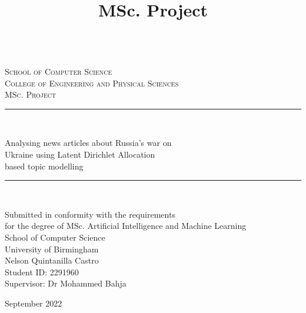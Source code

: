 \documentclass[twoside,12pt,a4paper]{article}
\title{MSc. Project\\\bhamthesistitle}
\author{\textsf{\bhamstudentname}}
\date{}
\newcommand{\bhamstudentname}{Nelson Quintanilla Castro}
\newcommand{\bhamfronttitle}{Analysing news articles about Russia’s war on\\Ukraine using Latent Dirichlet Allocation\\ based topic modelling}
\newcommand{\bhamschool}{School of Computer Science}
\newcommand{\bhamcollege}{Engineering and Physical Sciences}
\newcommand{\bhamdegree}{MSc. Artificial Intelligence and Machine Learning}
\newcommand{\bhamid}{2291960}
\newcommand{\bhamsupervisor}{Dr Mohammed Bahja}
\newcommand{\bhamyear}{2022}
\newcommand{\HRule}{\rule{\linewidth}{0.5mm}}
\begin{document}
\begin{titlepage}
\begin{center}
\begin{minipage}{6in}
  \centering
  \hspace*{.2in}
  \end{minipage}
  \\ [1.0cm]
\textsc{{\LARGE \bhamschool\\}College of \bhamcollege}\\[3.5cm]

\textsc{\Large MSc. Project}\\[0.5cm]

\HRule \\[0.4cm]
\begin{center}\Huge
\bhamfronttitle
\end{center}
\HRule \\[1.5cm]

\begin{center}
Submitted in conformity with the requirements\\ for the degree of \bhamdegree\\
\bhamschool\\ University of Birmingham\\
\vspace{2cm}
\bhamstudentname\\
Student ID: \bhamid\\
Supervisor: \bhamsupervisor      
\end{center}
\vfill

{\large September \bhamyear}

\end{center}
\end{titlepage}
\cleardoublepage
\end{document}
